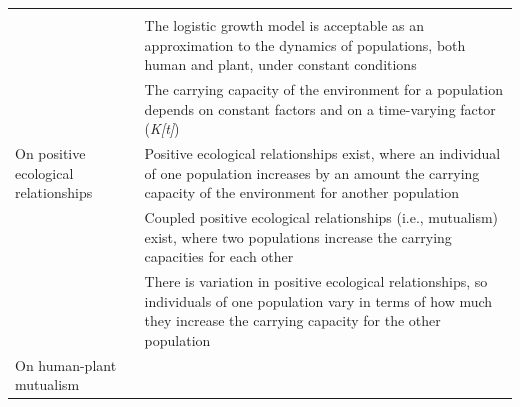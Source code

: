 \documentclass[
]{book}
\begin{document}
\begin{longtable}[]{@{}ll@{}}
\begin{minipage}[t]{0.49\columnwidth}
\end{minipage}\tabularnewline
\begin{minipage}[t]{0.45\columnwidth}\raggedright
﻿\strut
\end{minipage} & \begin{minipage}[t]{0.49\columnwidth}\raggedright
The logistic growth model is acceptable as an approximation to the dynamics of populations, both human and plant, under constant conditions\strut
\end{minipage}\tabularnewline
\begin{minipage}[t]{0.45\columnwidth}\raggedright
﻿\strut
\end{minipage} & \begin{minipage}[t]{0.49\columnwidth}\raggedright
The carrying capacity of the environment for a population depends on constant factors and on a time-varying factor (\emph{K{[}t{]}})\strut
\end{minipage}\tabularnewline
\begin{minipage}[t]{0.45\columnwidth}\raggedright
On positive ecological relationships\strut
\end{minipage} & \begin{minipage}[t]{0.49\columnwidth}\raggedright
Positive ecological relationships exist, where an individual of one population increases by an amount the carrying capacity of the environment for another population\strut
\end{minipage}\tabularnewline
\begin{minipage}[t]{0.45\columnwidth}\raggedright
﻿\strut
\end{minipage} & \begin{minipage}[t]{0.49\columnwidth}\raggedright
Coupled positive ecological relationships (i.e., mutualism) exist, where two populations increase the carrying capacities for each other\strut
\end{minipage}\tabularnewline
\begin{minipage}[t]{0.45\columnwidth}\raggedright
﻿\strut
\end{minipage} & \begin{minipage}[t]{0.49\columnwidth}\raggedright
There is variation in positive ecological relationships, so individuals of one population vary in terms of how much they increase the carrying capacity for the other population\strut
\end{minipage}\tabularnewline
\begin{minipage}[t]{0.45\columnwidth}\raggedright
On human-plant mutualism\strut
\end{minipage} & \begin{minipage}[t]{0.49\columnwidth}\raggedright

\end{minipage}
\end{longtable}
\end{document}
